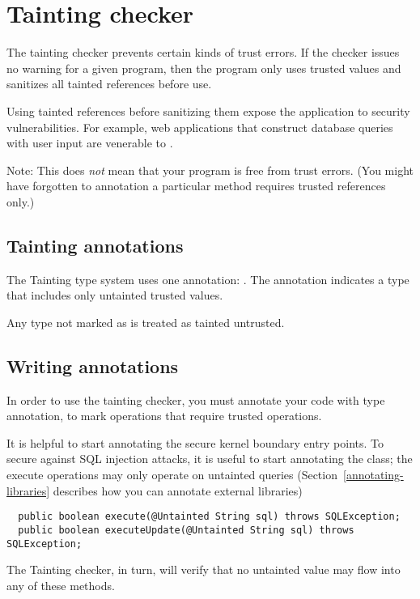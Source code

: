 \htmlhr
\section{Tainting checker\label{tainting-checker}}

The tainting checker prevents certain kinds of trust errors.  If the
checker issues no warning for a given program, then the program only
uses trusted values and sanitizes all tainted references before use.

Using tainted references before sanitizing them expose the application
to security vulnerabilities.  For example, web applications that construct
database queries with user input are venerable to
.

Note: This does \emph{not} mean that your program is free from trust errors.
(You might have forgotten to annotation a particular method requires trusted
references only.)

\subsection{Tainting annotations\label{tainting-annotations}}

The Tainting type system uses one annotation:
.  The annotation indicates
a type that includes only untainted trusted values.

Any type not marked as  is treated as tainted untrusted.

\subsection{Writing  annotations\label{writing-untainted}}

In order to use the tainting checker, you must annotate your code with
 type annotation, to mark
operations that require trusted operations.

It is helpful to start annotating the secure kernel boundary entry
points.  To secure against SQL injection attacks, it is useful to
start annotating the 
class; the execute operations may only operate on untainted queries
(Section~\ref{annotating-libraries} describes how you can annotate
external libraries)

\begin{Verbatim}
  public boolean execute(@Untainted String sql) throws SQLException;
  public boolean executeUpdate(@Untainted String sql) throws SQLException; 
\end{Verbatim}

The Tainting checker, in turn, will verify that no untainted value may flow into
any of these methods.

